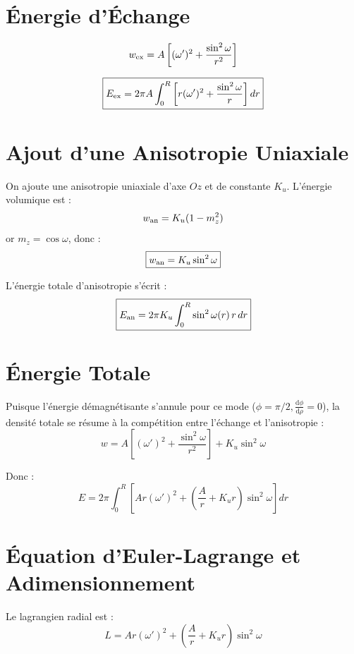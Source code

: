 \documentclass[11pt,a4paper]{article}
\begin{document}

\section{Énergie d'Échange}

\[
w_{\rm ex}
=
A\left[
(\omega')^2+\frac{\sin^2\omega}{r^2}
\right]
\]

\[
\boxed{
E_{\rm ex}
=
2\pi A
\int_0^R
\left[
r(\omega')^2+\frac{\sin^2\omega}{r}
\right]dr
}
\]


\section{Ajout d'une Anisotropie Uniaxiale}

On ajoute une anisotropie uniaxiale d'axe $Oz$ et de constante $K_u$.
L'énergie volumique est :
\[
w_{\rm an}
=
K_u(1-m_z^2)
\]
or $m_z=\cos\omega$, donc :
\[
\boxed{
w_{\rm an}=K_u\sin^2\omega
}
\]

L'énergie totale d'anisotropie s'écrit :
\[
\boxed{
E_{\rm an}
=
2\pi K_u
\int_0^R
\sin^2\omega(r)\,r\,dr
}
\]


\section{Énergie Totale}

Puisque l'énergie démagnétisante s'annule pour ce mode ($\phi=\pi/2, \frac{\text{d}\phi}{\text{d}\rho}=0$), la densité totale se résume à la compétition entre l'échange et l'anisotropie :
\[
w=
A\left[
(\omega')^2+\frac{\sin^2\omega}{r^2}
\right]
+
K_u\sin^2\omega
\]

Donc :
\[
\boxed{
E
=
2\pi
\int_0^R
\left[
Ar(\omega')^2
+
\left(\frac{A}{r}+K_u r\right)\sin^2\omega
\right]dr
}
\]


\section{Équation d'Euler-Lagrange et Adimensionnement}

Le lagrangien radial est :
\[
L=
Ar(\omega')^2
+
\left(\frac{A}{r}+K_u r\right)\sin^2\omega
\]
\end{document}
